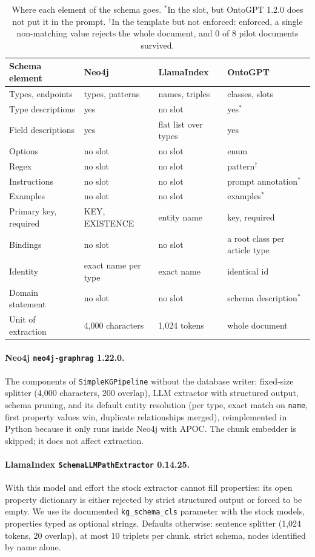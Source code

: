 \documentclass[11pt]{article}
\newcommand{\code}[1]{\texttt{#1}}
\begin{document}
\begin{table}[h]
\centering
\small
\begin{tabular}{llll}
\toprule
Schema element & Neo4j & LlamaIndex & OntoGPT \\
\midrule
Types, endpoints & types, patterns & names, triples & classes, slots \\
Type descriptions & yes & no slot & yes$^{*}$ \\
Field descriptions & yes & flat list over types & yes \\
Options & no slot & no slot & enum \\
Regex & no slot & no slot & pattern$^{\dagger}$ \\
Instructions & no slot & no slot & prompt annotation$^{*}$ \\
Examples & no slot & no slot & examples$^{*}$ \\
Primary key, required & KEY, EXISTENCE & entity name & key, required \\
Bindings & no slot & no slot & a root class per article type \\
Identity & exact name per type & exact name & identical id \\
Domain statement & no slot & no slot & schema description$^{*}$ \\
\midrule
Unit of extraction & 4,000 characters & 1,024 tokens & whole document \\
\bottomrule
\end{tabular}
\caption{Where each element of the schema goes. $^{*}$In the slot, but OntoGPT 1.2.0 does not put
it in the prompt. $^{\dagger}$In the template but not enforced: enforced, a single non-matching
value rejects the whole document, and 0 of 8 pilot documents survived.}
\label{tab:slots}
\end{table}

\paragraph{Neo4j \code{neo4j-graphrag} 1.22.0.} The components of \code{SimpleKGPipeline} without the
database writer: fixed-size splitter (4,000 characters, 200 overlap), LLM extractor with structured
output, schema pruning, and its default entity resolution (per type, exact match on \code{name},
first property values win, duplicate relationships merged), reimplemented in Python because it
only runs inside Neo4j with APOC. The chunk embedder is skipped; it does not affect extraction.

\paragraph{LlamaIndex \code{SchemaLLMPathExtractor} 0.14.25.} With this model and effort the stock
extractor cannot fill properties: its open property dictionary is either rejected by strict
structured output or forced to be empty. We use its documented \code{kg\_schema\_cls} parameter
with the stock models, properties typed as optional strings. Defaults otherwise: sentence splitter
(1,024 tokens, 20 overlap), at most 10 triplets per chunk, strict schema, nodes identified by name
alone.
\end{document}

